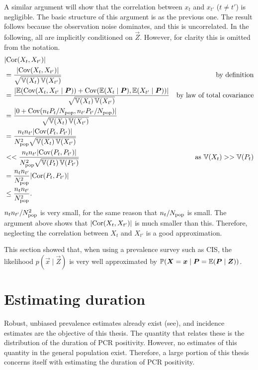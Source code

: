 \documentclass[thesis.tex]{subfiles}
\begin{document}
A similar argument will show that the correlation between $x_t$ and $x_{t'}$ ($t \neq t'$) is negligible.
The basic structure of this argument is as the previous one.
The result follows because the observation noise dominates, and this is uncorrelated.
In the following, all are implicitly conditioned on $\vec{Z}$.
However, for clarity this is omitted from the notation.
\begin{align}
  &\lvert \operatorname{Cor}(X_t, X_{t'}) \rvert \\
  &= \frac{\lvert\operatorname{Cov}(X_t, X_{t'})\rvert}{\sqrt{\operatorname{\mathbb{V}}(X_t) \operatorname{\mathbb{V}}(X_{t'})}} &\text{by definition}\\
  &= \frac{\lvert \operatorname{\mathbb{E}}(\operatorname{Cov}(X_t, X_{t'} \mid \bm{P})) + \operatorname{Cov}(\operatorname{\mathbb{E}}(X_t \mid \bm{P}), \operatorname{\mathbb{E}}(X_{t'} \mid \bm{P})) \rvert}{\sqrt{\operatorname{\mathbb{V}}(X_t) \operatorname{\mathbb{V}}(X_{t'})}} &\text{by law of total covariance} \\
  &= \frac{\lvert 0 + \operatorname{Cov}(n_t P_t / N_\text{pop}, n_{t'} P_{t'} / N_\text{pop}) \rvert}{\sqrt{\operatorname{\mathbb{V}}(X_t) \operatorname{\mathbb{V}}(X_{t'})}} \\
  &= \frac{n_t n_{t'} \lvert \operatorname{Cov}(P_t, P_{t'}) \rvert}{N_\text{pop}^2 \sqrt{\operatorname{\mathbb{V}}(X_t) \operatorname{\mathbb{V}}(X_{t'})}}  \\
  &<< \frac{n_t n_{t'} \lvert \operatorname{Cov}(P_t, P_{t'}) \rvert}{N_\text{pop}^2 \sqrt{\operatorname{\mathbb{V}}(P_t) \operatorname{\mathbb{V}}(P_{t'})}} &\text{as $\operatorname{\mathbb{V}}(X_t) >> \operatorname{\mathbb{V}}(P_t)$} \\
  &= \frac{n_t n_{t'}}{N_\text{pop}^2} \lvert \operatorname{Cor}(P_t, P_{t'}) \rvert \\
  &\leq \frac{n_t n_{t'}}{N_\text{pop}^2}.
\end{align}
$n_t n_{t'} / N_\text{pop}^2$ is very small, for the same reason that $n_t / N_\text{pop}$ is small.
The argument above shows that $\lvert \operatorname{Cor}(X_t, X_{t'}) \rvert$ is much smaller than this.
Therefore, neglecting the correlation between $X_t$ and $X_{t'}$ is a good approximation.

This section showed that, when using a prevalence survey such as CIS, the likelihood $p(\vec{x} \mid \vec{Z})$ is very well approximated by $\operatorname{\mathbb{P}}(\bm{X} = \bm{x} \mid \bm{P} = \operatorname{\mathbb{E}}(\bm{P} \mid \bm{Z}))$.


\section{Estimating duration} \label{inc-prev:sec:duration}

Robust, unbiased prevalence estimates already exist (see), and incidence estimates are the objective of this thesis.
The quantity that relates these is the distribution of the duration of PCR positivity.
However, no estimates of this quantity in the general population exist.
Therefore, a large portion of this thesis concerns itself with estimating the duration of PCR positivity.
\end{document}

